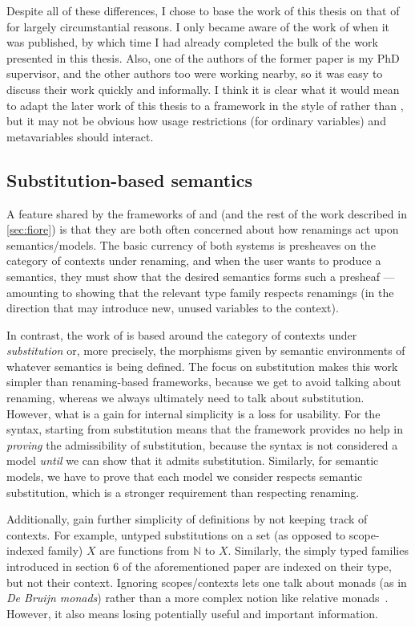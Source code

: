 Despite all of these differences,
I chose to base the work of this thesis on that of \citet{AACMM21} for largely
circumstantial reasons.
I only became aware of the work of \citet{FS22} when it was published, by which
time I had already completed the bulk of the work presented in this thesis.
Also, one of the authors of the former paper is my PhD supervisor, and the other
authors too were working nearby, so it was easy to discuss their work quickly
and informally.
I think it is clear what it would mean to adapt the later work of this thesis to
a framework in the style of \citeauthor{FS22} rather than \citeauthor{AACMM21},
but it may not be obvious how usage restrictions (for ordinary variables) and
metavariables should interact.

\subsection{Substitution-based semantics}

A feature shared by the frameworks of \citet{AACMM21} and \citet{FPT99} (and
the rest of the work described in \cref{sec:fiore}) is that they are both often
concerned about how renamings act upon semantics/models.
The basic currency of both systems is presheaves on the category of contexts
under renaming, and when the user wants to produce a semantics, they must show
that the desired semantics forms such a presheaf --- amounting to showing that
the relevant type family respects renamings (in the direction that may introduce
new, unused variables to the context).

In contrast, the work of \citet{HHLM22} is based around the category of contexts
under \emph{substitution} or, more precisely, the morphisms given by semantic
environments of whatever semantics is being defined.
The focus on substitution makes this work simpler than renaming-based
frameworks, because we get to avoid talking about renaming, whereas we always
ultimately need to talk about substitution.
However, what is a gain for internal simplicity is a loss for usability.
For the syntax, starting from substitution means that the framework provides no
help in \emph{proving} the admissibility of substitution, because the syntax is
not considered a model \emph{until} we can show that it admits substitution.
Similarly, for semantic models, we have to prove that each model we consider
respects semantic substitution, which is a stronger requirement than
respecting renaming.

Additionally, \citet{HHLM22} gain further simplicity of definitions by not
keeping track of contexts.
For example, untyped substitutions on a set (as opposed to scope-indexed family)
$X$ are functions from $\mathbb N$ to $X$.
Similarly, the simply typed families introduced in section 6 of the
aforementioned paper are indexed on their type, but not their context.
Ignoring scopes/contexts lets one talk about monads (as in
\emph{De Bruijn monads}) rather than a more complex notion like relative
monads~\citep{ACU15}.
However, it also means losing potentially useful and important information.

